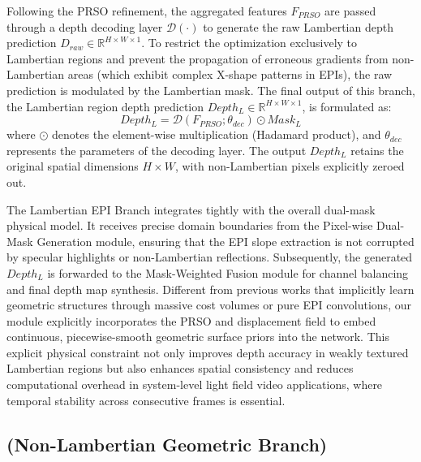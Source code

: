 Following the PRSO refinement, the aggregated features $F_{PRSO}$ are passed through a depth decoding layer $\mathcal{D}(\cdot)$ to generate the raw Lambertian depth prediction $D_{raw} \in \mathbb{R}^{H \times W \times 1}$. To restrict the optimization exclusively to Lambertian regions and prevent the propagation of erroneous gradients from non-Lambertian areas (which exhibit complex X-shape patterns in EPIs), the raw prediction is modulated by the Lambertian mask. The final output of this branch, the Lambertian region depth prediction $Depth_L \in \mathbb{R}^{H \times W \times 1}$, is formulated as:
\begin{equation}
\label{eq:eq17}
Depth_L = \mathcal{D}(F_{PRSO}; \theta_{dec}) \odot Mask_L
\end{equation}
where $\odot$ denotes the element-wise multiplication (Hadamard product), and $\theta_{dec}$ represents the parameters of the decoding layer. The output $Depth_L$ retains the original spatial dimensions $H \times W$, with non-Lambertian pixels explicitly zeroed out.

The Lambertian EPI Branch integrates tightly with the overall dual-mask physical model. It receives precise domain boundaries from the Pixel-wise Dual-Mask Generation module, ensuring that the EPI slope extraction is not corrupted by specular highlights or non-Lambertian reflections. Subsequently, the generated $Depth_L$ is forwarded to the Mask-Weighted Fusion module for channel balancing and final depth map synthesis. Different from previous works that implicitly learn geometric structures through massive cost volumes or pure EPI convolutions, our module explicitly incorporates the PRSO and displacement field to embed continuous, piecewise-smooth geometric surface priors into the network. This explicit physical constraint not only improves depth accuracy in weakly textured Lambertian regions but also enhances spatial consistency and reduces computational overhead in system-level light field video applications, where temporal stability across consecutive frames is essential.

\subsection{(Non-Lambertian Geometric Branch)}

